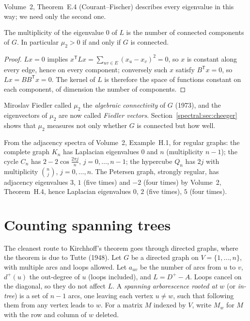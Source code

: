 Volume~2, Theorem~E.4 (Courant--Fischer) describes every eigenvalue in this way; we need only the second one.

\begin{proposition}\label{spectral:prop:components}
The multiplicity of the eigenvalue $0$ of $L$ is the number of connected components of $G$. In particular $\mu_2>0$ if and only if $G$ is connected.
\end{proposition}
\begin{proof}
$Lx=0$ implies $x^{\mathsf T}Lx=\sum_{uv\in E}(x_u-x_v)^2=0$, so $x$ is constant along every edge, hence on every component; conversely such $x$ satisfy $B^{\mathsf T}x=0$,
so $Lx=BB^{\mathsf T}x=0$. The kernel of $L$ is therefore the space of functions constant on each component, of dimension the number of components.
\end{proof}

Miroslav Fiedler called $\mu_2$ the \emph{algebraic connectivity} of $G$ (1973), and the eigenvectors of $\mu_2$ are now called \emph{Fiedler vectors}.
Section~\ref{spectral:sec:cheeger} shows that $\mu_2$ measures not only whether $G$ is connected but how well.

\begin{example}\label{spectral:ex:lapspectra}
From the adjacency spectra of Volume~2, Example~H.1, for regular graphs: the complete graph $K_n$ has Laplacian eigenvalues $0$ and $n$ (multiplicity $n-1$);
the cycle $C_n$ has $2-2\cos\frac{2\pi j}n$, $j=0,\dots,n-1$; the hypercube $Q_n$ has $2j$ with multiplicity $\binom nj$, $j=0,\dots,n$. The Petersen graph, strongly regular,
has adjacency eigenvalues $3$, $1$ (five times) and $-2$ (four times) by Volume~2, Theorem~H.4, hence Laplacian eigenvalues $0$, $2$ (five times), $5$ (four times).
\end{example}

\section{Counting spanning trees}

The cleanest route to Kirchhoff's theorem goes through directed graphs, where the theorem is due to Tutte (1948). Let $G$ be a directed graph on
$V=\{1,\dots,n\}$, with multiple arcs and loops allowed. Let $a_{uv}$ be the number of arcs from $u$ to $v$, $d^+(u)$ the out-degree of $u$ (loops
included), and $L=D^+-A$. Loops cancel on the diagonal, so they do not affect $L$. A \emph{spanning arborescence rooted at $w$} (or \emph{in-tree}) is a set of
$n-1$ arcs, one leaving each vertex $u\ne w$, such that following them from any vertex leads to $w$. For a matrix $M$ indexed by $V$, write $M_w$ for $M$ with the row
and column of $w$ deleted.


